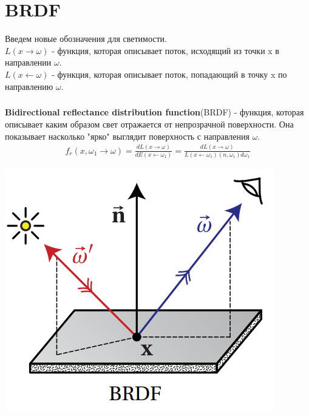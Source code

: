 \documentclass[titlepage]{article}
\begin{document}
\section{BRDF}
	Введем новые обозначения для светимости. \\
	$L(x\rightarrow\omega)$ - функция, которая описывает поток, исходящий из точки x в направлении $\omega$. \\
	$L(x\leftarrow\omega)$ - функция, которая описывает поток, попадающий в точку x по направлению $\omega$. 
\subparagraph{} \textbf{Bidirectional reflectance distribution function}(BRDF) - функция, которая описывает каким образом свет отражается от непрозрачной поверхности. Она показывает насколько "ярко"  выглядит поверхность с направления $\omega$.
\begin{gather}
	f_r(x, \omega_1\rightarrow\omega) = \frac{dL(x\rightarrow\omega)}{dE(x\leftarrow\omega_1)} = \frac{dL(x\rightarrow\omega)}{L(x\leftarrow\omega_1)(n,\omega_1)d\omega_1}
\end{gather}
\begin{center}
	\includegraphics[scale=0.5]{BRDF.png}
\end{center}
\end{document}
